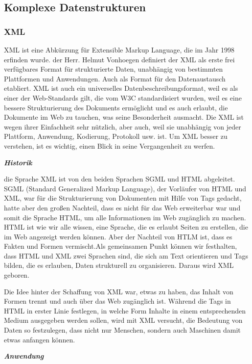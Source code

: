 \subsection{Komplexe Datenstrukturen}
\subsubsection{XML}
XML ist eine Abkürzung für Extensible Markup Language, die im Jahr 1998 erfinden wurde. der Herr. Helmut Vonhoegen definiert der XML als erste frei verfügbares Format für strukturierte Daten, unabhängig von bestimmten Plattformen und Anwendungen. Auch als Format für den Datenaustausch etabliert. XML ist auch ein universelles Datenbeschreibungsformat, weil es als einer der Web-Standards gilt, die vom W3C standardisiert wurden, weil es eine bessere Strukturierung des Dokuments ermöglicht und es auch erlaubt, die Dokumente im Web zu tauchen, was seine Besonderheit ausmacht. Die XML ist wegen ihrer Einfachheit sehr nützlich, aber auch, weil sie unabhängig von jeder Plattform, Anwendung, Kodierung, Protokoll usw. ist. Um XML besser zu verstehen, ist es wichtig, einen Blick in seine Vergangenheit zu werfen.

\textit{\textbf{Historik}}

die Sprache XML ist von den beiden Sprachen SGML und HTML abgeleitet. SGML (Standard Generalized Markup Language), der Vorläufer von HTML und XML, war für die Strukturierung von Dokumenten mit Hilfe von Tags gedacht, hatte aber den großen Nachteil, dass es nicht für das Web erweiterbar war und somit die Sprache HTML, um alle Informationen im Web zugänglich zu machen.  HTML ist wie wir alle wissen, eine Sprache, die es erlaubt Seiten zu erstellen, die im Web angezeigt werden können. Aber der Nachteil von HTLM ist, dass es Fakten und Formen vermischt.Als gemeinsamen Punkt können wir festhalten, dass HTML und XML zwei Sprachen sind, die sich am Text orientieren und Tags bilden, die es erlauben, Daten strukturell zu organisieren. Daraus wird XML geboren. 

Die Idee hinter der Schaffung von XML war, etwas zu haben, das Inhalt von Formen trennt und auch über das Web zugänglich ist. Während die Tags in HTML in erster Linie festlegen, in welche Form Inhalte in einem entsprechenden Medium ausgegeben werden sollen, wird mit XML versucht, die Bedeutung von Daten so festzulegen, dass nicht nur Menschen, sondern auch Maschinen damit etwas anfangen können.\cite{helmut32}

\textit{\textbf{Anwendung}}

